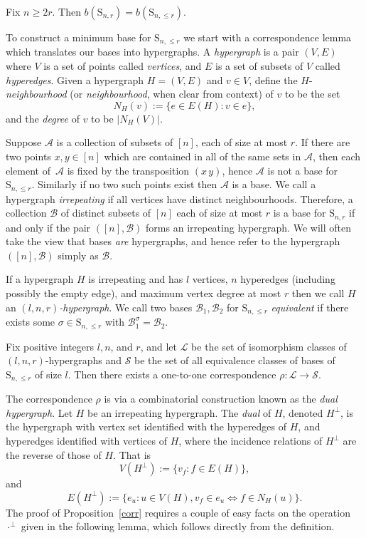 \documentclass[ALCO,published]{cedram}
\renewcommand\S{\mathrm{S}}
\begin{document}
\begin{lemma}\label{hallem}
Fix $n\geq 2r$. Then $b(\S_{n,r})=b(\S_{n,\leq r})$.
\end{lemma}

To construct a minimum base for $\S_{n,\leq r}$ we start with a correspondence lemma which translates our bases into hypergraphs. A \emph{hypergraph} is a pair $(V,E)$ where $V$ is a set of points called \emph{vertices}, and $E$ is a set of subsets of $V$ called \emph{hyperedges}. Given a hypergraph $H=(V,E)$ and $v\in V$, define the $H$-\emph{neighbourhood} (or \emph{neighbourhood}, when clear from context) of $v$ to be the set $$N_H(v):=\{e\in E(H) : v\in e\},$$ and the \emph{degree} of $v$ to be $|N_{H}(V)|$. 

Suppose $\mathcal{A}$ is a collection of subsets of $[n]$, each of size at most $r$. If there are two points $x,y\in [n]$ which are contained in all of the same sets in $\mathcal{A}$, then each element of~$\mathcal{A}$ is fixed by the transposition $(x\, y)$, hence $\mathcal{A}$ is not a base for $\S_{n,\leq r}$. Similarly if no two such points exist then $\mathcal{A}$ is a base. We call a hypergraph \emph{irrepeating} if all vertices have distinct neighbourhoods. Therefore, a collection $\mathcal{B}$ of distinct subsets of $[n]$ each of size at most $r$ is a base for $\S_{n,r}$ if and only if the pair $([n],\mathcal{B})$ forms an irrepeating hypergraph. We will often take the view that bases \emph{are} hypergraphs, and hence refer to the hypergraph $([n],\mathcal{B})$ simply as $\mathcal{B}$.

If a hypergraph $H$ is irrepeating and has $l$ vertices, $n$ hyperedges (including possibly the empty edge), and maximum vertex degree at most $r$ then we call $H$ an \emph{$(l,n,r)$-hypergraph}. We call two bases $\mathcal{B}_1,\mathcal{B}_2$ for $\S_{n,\leq r}$ \emph{equivalent} if there exists some $\sigma\in\S_{n,\leq r}$ with $\mathcal{B}_1^\sigma=\mathcal{B}_2$.

\begin{prop}\label{corr}
Fix positive integers $l,n$, and $r$, and let $\mathcal{L}$ be the set of isomorphism classes of $(l,n,r)$-hypergraphs and $\mathcal{S}$ be the set of all equivalence classes of bases of~$\S_{n,\leq r}$ of size $l$. Then there exists a one-to-one correspondence $\rho: \mathcal{L}\to\mathcal{S}$.
\end{prop}

The correspondence $\rho$ is via a combinatorial construction known as the \emph{dual hypergraph}. Let $H$ be an irrepeating hypergraph. The \emph{dual} of $H$, denoted $H^\perp$, is the hypergraph with vertex set identified with the hyperedges of $H$, and hyperedges identified with vertices of $H$, where the incidence relations of $H^\perp$ are the reverse of those of $H$. That is $$V(H^\perp):=\{v_f : f\in E(H)\},$$ and $$E(H^\perp):=\{e_u : u\in V(H), v_{f}\in e_u\iff f\in N_H(u)\}.$$ The proof of Proposition~\ref{corr} requires a couple of easy facts on the operation $\cdot^\perp$ given in the following lemma, which follows directly from the definition.
\end{document}
